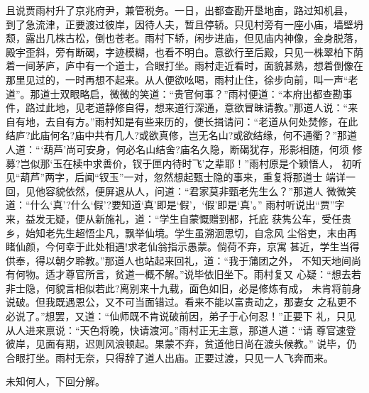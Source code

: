 且说贾雨村升了京兆府尹，兼管税务。一日，出都查勘开垦地亩，路过知机县，
到了急流津，正要渡过彼岸，因待人夫，暂且停轿。只见村旁有一座小庙，墙壁坍
颓，露出几株古松，倒也苍老。雨村下轿，闲步进庙，但见庙内神像，金身脱落，
殿宇歪斜，旁有断碣，字迹模糊，也看不明白。意欲行至后殿，只见一株翠柏下荫
着一间茅庐，庐中有一个道士，合眼打坐。雨村走近看时，面貌甚熟，想着倒像在
那里见过的，一时再想不起来。从人便欲吆喝，雨村止住，徐步向前，叫一声“老
道”。那道士双眼略启，微微的笑道：“贵官何事？”雨村便道：“本府出都查勘事
件，路过此地，见老道静修自得，想来道行深通，意欲冒昧请教。”那道人说：“来
自有地，去自有方。”雨村知是有些来历的，便长揖请问：“老道从何处焚修，在此
结庐?此庙何名?庙中共有几人?或欲真修，岂无名山?或欲结缘，何不通衢？”那道
人道：“‘葫芦’尚可安身，何必名山结舍?庙名久隐，断碣犹存，形影相随，何须
修募?岂似那‘玉在椟中求善价，钗于匣内待时飞’之辈耶！”雨村原是个颖悟人，
初听见“葫芦”两字，后闻“钗玉”一对，忽然想起甄士隐的事来，重复将那道士
端详一回，见他容貌依然，便屏退从人，问道：“君家莫非甄老先生么？”那道人
微微笑道：“什么‘真’?什么‘假’?要知道‘真’即是‘假’，‘假’即是‘真’。”
雨村听说出“贾”字来，益发无疑，便从新施礼，道：“学生自蒙慨赠到都，托庇
获隽公车，受任贵乡，始知老先生超悟尘凡，飘举仙境。学生虽溯洄思切，自念风
尘俗吏，末由再睹仙颜，今何幸于此处相遇!求老仙翁指示愚蒙。倘荷不弃，京寓
甚近，学生当得供奉，得以朝夕聆教。”那道人也站起来回礼，道：“我于蒲团之外，
不知天地间尚有何物。适才尊官所言，贫道一概不解。”说毕依旧坐下。雨村复又
心疑：“想去若非士隐，何貌言相似若此?离别来十九载，面色如旧，必是修炼有成，
未肯将前身说破。但我既遇恩公，又不可当面错过。看来不能以富贵动之，那妻女
之私更不必说了。”想罢，又道：“仙师既不肯说破前因，弟子于心何忍！”正要下
礼，只见从人进来禀说：“天色将晚，快请渡河。”雨村正无主意，那道人道：“请
尊官速登彼岸，见面有期，迟则风浪顿起。果蒙不弃，贫道他日尚在渡头候教。”
说毕，仍合眼打坐。雨村无奈，只得辞了道人出庙。正要过渡，只见一人飞奔而来。

未知何人，下回分解。